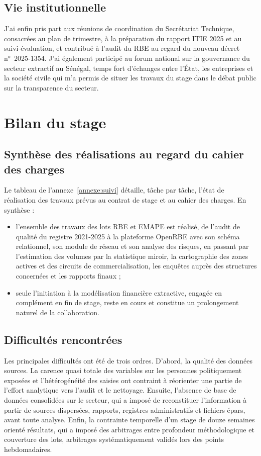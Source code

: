 \documentclass[12pt, a4paper]{article}
\begin{document}
\subsection{Vie institutionnelle}

J'ai enfin pris part aux réunions de coordination du Secrétariat Technique, consacrées au plan de
trimestre, à la préparation du rapport ITIE 2025 et au suivi-évaluation, et
contribué à l'audit du RBE au regard du nouveau décret n°~2025-1354. J'ai également participé au
forum national sur la gouvernance du secteur extractif au Sénégal, temps fort
d'échanges entre l'État, les entreprises et la société civile qui m'a permis
de situer les travaux du stage dans le débat public sur la transparence du
secteur.

\section{Bilan du stage}

\subsection{Synthèse des réalisations au regard du cahier des charges}

Le tableau de l'annexe~\ref{annexe:suivi} détaille, tâche par tâche, l'état de
réalisation des travaux prévus au contrat de stage et au cahier des charges.
En synthèse :

\begin{itemize}
  \item l'ensemble des travaux des lots RBE et EMAPE est réalisé, de l'audit
  de qualité du registre 2021-2025 à la plateforme OpenRBE avec son schéma
  relationnel, son module de réseau et son analyse des risques, en passant par
  l'estimation des volumes par la statistique miroir, la cartographie des
  zones actives et des circuits de commercialisation, les enquêtes auprès des
  structures concernées et les rapports finaux ;
  \item seule l'initiation à la modélisation financière extractive, engagée
  en complément en fin de stage, reste en cours et constitue un prolongement
  naturel de la collaboration.
\end{itemize}

\subsection{Difficultés rencontrées}

Les principales difficultés ont été de trois ordres. D'abord, la
qualité des données sources. La carence quasi totale des variables
sur les personnes politiquement exposées et l'hétérogénéité des saisies ont contraint à réorienter une partie de
l'effort analytique vers l'audit et le nettoyage. Ensuite, l'absence de base de
données consolidées sur le secteur, qui a imposé de reconstituer l'information
à partir de sources dispersées, rapports, registres administratifs et fichiers
épars, avant toute analyse. Enfin, la contrainte temporelle d'un stage de douze
semaines orienté résultats, qui a imposé des arbitrages entre profondeur
méthodologique et couverture des lots, arbitrages systématiquement validés
lors des points hebdomadaires.
\end{document}
